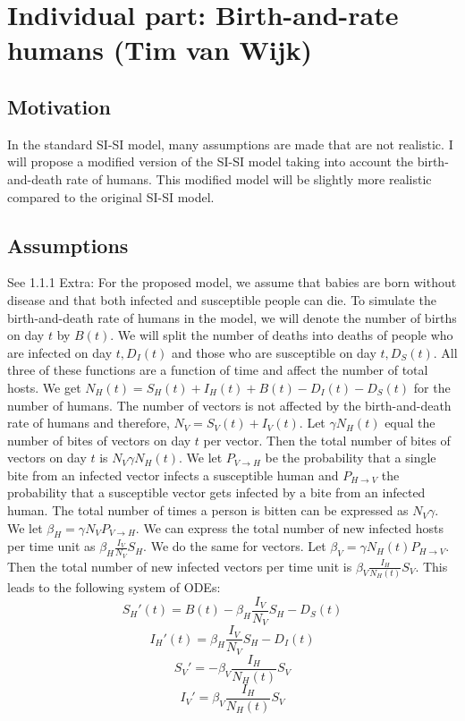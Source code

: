 \section{Individual part: Birth-and-rate humans (Tim van Wijk)}

\subsection*{Motivation}
In the standard SI-SI model, many assumptions are made that are not realistic. I will propose a modified version of the SI-SI model taking into account the birth-and-death rate of humans. This modified model will be slightly more realistic compared to the original SI-SI model.

\subsection*{Assumptions}
See 1.1.1
Extra:
For the proposed model, we assume that babies are born without disease and that both infected and susceptible people can die. To simulate the birth-and-death rate of humans in the model, we will denote the number of births on day $t$ by $B(t)$. We will split the number of deaths into deaths of people who are infected on day $t, D_I(t)$ and those who are susceptible on day $t, D_S(t)$. All three of these functions are a function of time and affect the number of total hosts. We get $N_H(t)=S_H(t) + I_H(t) + B(t)-D_I(t) -D_S(t)$ for the number of humans. The number of vectors is not affected by the birth-and-death rate of humans and therefore, $N_V = S_V(t) + I_V(t)$. Let $\gamma N_H(t)$ equal the number of bites of vectors on day $t$ per vector. Then the total number of bites of vectors on day $t$ is $N_V \gamma N_H(t)$. We let $P_{V\rightarrow H}$ be the probability that a single bite from an infected vector infects a susceptible human and $P_{H\rightarrow V}$ the probability that a susceptible vector gets infected by a bite from an infected human. The total number of times a person is bitten can be expressed as $N_V \gamma$.  We let $\beta_H = \gamma N_V P_{V\rightarrow H}$. We can express the total number of new infected hosts per time unit as $\beta_H \frac{I_V}{N_V} S_H$. We do the same for vectors. Let $\beta_V = \gamma N_H(t) P_{H\rightarrow V}$. Then the total number of new infected vectors per time unit is $\beta_V \frac{I_H}{N_H(t)} S_V$. This leads to the following system of ODEs:
\begin{equation}
S_H'(t) = B(t) -\beta_H \frac{I_V}{N_V} S_H - D_S(t) 
\end{equation}
\begin{equation}
I_H'(t) = \beta_H \frac{I_V}{N_V} S_H - D_I(t)
\end{equation}
\begin{equation}
S_V' = -\beta_V \frac{I_H}{N_H(t)} S_V
\end{equation}
\begin{equation}
I_V' = \beta_V \frac{I_H}{N_H(t)} S_V
\end{equation}